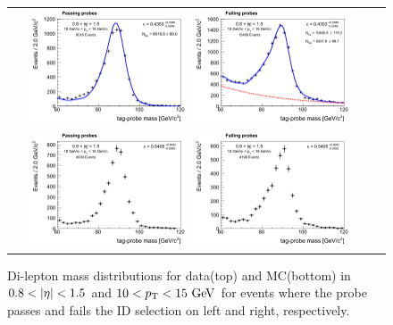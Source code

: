 %
\begin{figure}[htp] 
\centering 
\begin{tabular}{cc} 
\includegraphics[width=0.45\textwidth]{figures/passetapt_data_1.png} 
\includegraphics[width=0.45\textwidth]{figures/failetapt_data_1.png}  \\
\includegraphics[width=0.45\textwidth]{figures/passetapt_mc_1.png} 
\includegraphics[width=0.45\textwidth]{figures/failetapt_mc_1.png} 
\end{tabular} 
\caption{Di-lepton mass distributions for data(top) and MC(bottom) 
         in $0.8<|\Eta|<1.5$ and $10 < p_\mathrm{T} < 15~\mathrm{Ge\kern -0.1em V}$ for events 
         where the probe passes and fails the ID selection on left and right, 
         respectively. } 
\label{fig:ideff_pt10to15_eta0p8to1p5} 
\end{figure} 
